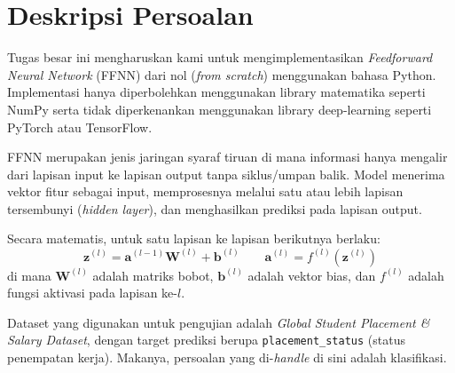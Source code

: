 \section{Deskripsi Persoalan}
Tugas besar ini mengharuskan kami untuk mengimplementasikan \textit{Feedforward Neural Network} (FFNN) dari nol (\textit{from scratch}) menggunakan bahasa Python. Implementasi hanya diperbolehkan menggunakan library matematika seperti NumPy serta tidak diperkenankan menggunakan library deep-learning seperti PyTorch atau TensorFlow.


FFNN merupakan jenis jaringan syaraf tiruan di mana informasi hanya mengalir dari lapisan input ke lapisan output tanpa siklus/umpan balik. Model menerima vektor fitur sebagai input, memprosesnya melalui satu atau lebih lapisan tersembunyi (\textit{hidden layer}), dan menghasilkan prediksi pada lapisan
output.

Secara matematis, untuk satu lapisan ke lapisan berikutnya berlaku:
\begin{equation}
    \mathbf{z}^{(l)} = \mathbf{a}^{(l-1)} \mathbf{W}^{(l)} + \mathbf{b}^{(l)}
    \qquad
    \mathbf{a}^{(l)} = f^{(l)}\!\left(\mathbf{z}^{(l)}\right)
\end{equation}
di mana $\mathbf{W}^{(l)}$ adalah matriks bobot, $\mathbf{b}^{(l)}$ adalah vektor bias, dan $f^{(l)}$ adalah fungsi aktivasi pada lapisan ke-$l$.

Dataset yang digunakan untuk pengujian adalah \textit{Global Student Placement \& Salary Dataset}, dengan target prediksi berupa \texttt{placement\_status} (status penempatan kerja). Makanya, persoalan yang di-\textit{handle} di sini adalah klasifikasi.
